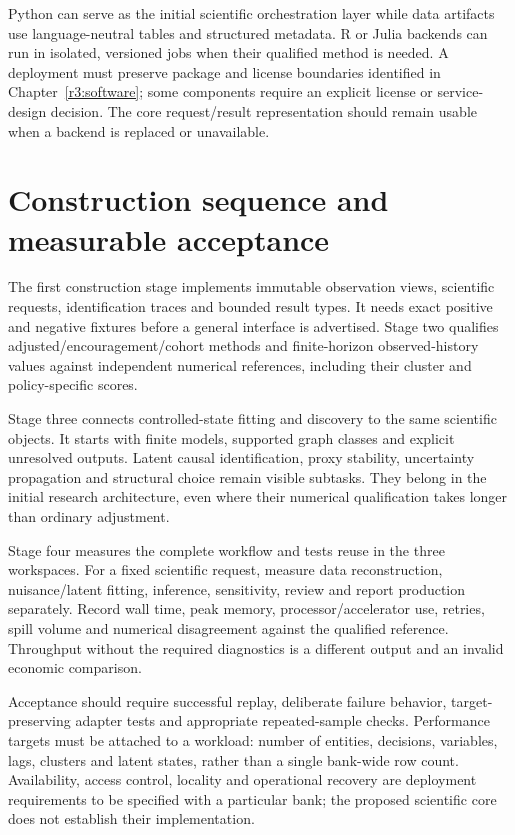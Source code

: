 Python can serve as the initial scientific orchestration layer while
data artifacts use language-neutral tables and structured metadata.
R or Julia backends can run in isolated, versioned jobs when their
qualified method is needed. A deployment must preserve package and
license boundaries identified in Chapter~\ref{r3:software}; some
components require an explicit license or service-design decision.
The core request/result representation should remain usable when a
backend is replaced or unavailable.

\section{Construction sequence and measurable acceptance}
\label{r3:construction-sequence}

The first construction stage implements immutable observation views,
scientific requests, identification traces and bounded result types.
It needs exact positive and negative fixtures before a general interface
is advertised. Stage two qualifies adjusted/encouragement/cohort methods
and finite-horizon observed-history values against independent numerical
references, including their cluster and policy-specific scores.

Stage three connects controlled-state fitting and discovery to the same
scientific objects. It starts with finite models, supported graph classes
and explicit unresolved outputs. Latent causal identification, proxy
stability, uncertainty propagation and structural choice remain visible
subtasks. They belong in the initial research architecture, even where
their numerical qualification takes longer than ordinary adjustment.

Stage four measures the complete workflow and tests reuse in the three
workspaces. For a fixed scientific request, measure data reconstruction,
nuisance/latent fitting, inference, sensitivity, review and report
production separately. Record wall time, peak memory, processor/accelerator
use, retries, spill volume and numerical disagreement against the
qualified reference. Throughput without the required diagnostics is a
different output and an invalid economic comparison.

Acceptance should require successful replay, deliberate failure behavior,
target-preserving adapter tests and appropriate repeated-sample checks.
Performance targets must be attached to a workload: number of entities,
decisions, variables, lags, clusters and latent states, rather than a
single bank-wide row count. Availability, access control, locality and
operational recovery are deployment requirements to be specified with a
particular bank; the proposed scientific core does not establish their
implementation.

